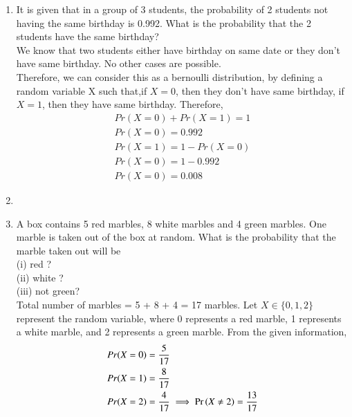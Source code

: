 \renewcommand{\theequation}{\theenumi}
\begin{enumerate}[label=\thesection.\arabic*.,ref=\thesection.\theenumi]

\item It is given that in a group of 3 students, the probability of 2 students not having the
same birthday is 0.992. What is the probability that the 2 students have the same
birthday?
\\
\solution 
We know that two students either have birthday on same date or they don't have same birthday. No other cases are possible.\\
Therefore, we can consider this as a bernoulli distribution, by defining a random variable X such that,if $X=0$, then they don't have same birthday, if $X=1$, then they have same birthday.
Therefore,
\begin{align}
Pr(X=0)+Pr(X=1)=1\\
Pr(X=0)=0.992\\
Pr(X=1)=1-Pr(X=0)\\
Pr(X=0)=1-0.992\\
Pr(X=0)=0.008
\end{align}
\item 


\item A box contains 5 red marbles, 8 white marbles and 4 green marbles. One marble is taken
out of the box at random. What is the probability that the marble taken out will be\\
(i) red ?\\
(ii) white ? \\
(iii) not green?
\\
\solution 
Total number of marbles = 5 + 8 + 4 = 17 marbles.
Let $X \in \{0,1,2\}$ represent the random variable, where 0 represents a red marble, 1 represents a white marble, and 2 represents a green marble. From the given information, 
\begin{align}
    Pr(X=0) &= \frac{5}{17} \\
    Pr(X=1) &= \frac{8}{17} \\
    Pr(X=2) &= \frac{4}{17} \implies \Pr\left(X\ne 2\right) = \frac{13}{17}
\end{align}


\end{enumerate}
